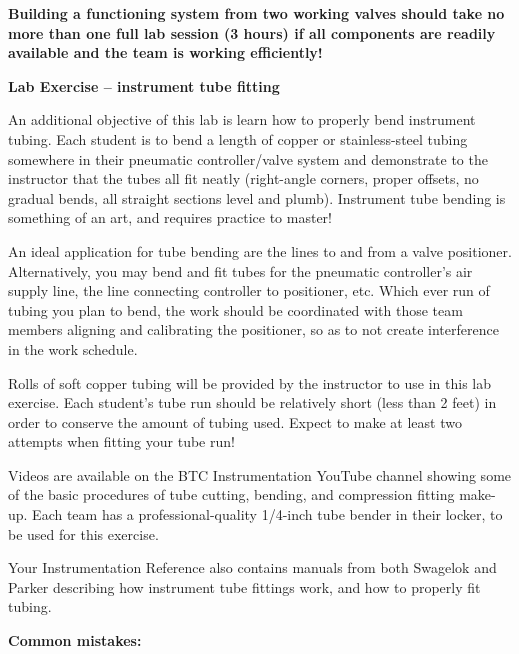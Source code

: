 \vskip 10pt

{\bf Building a functioning system from two working valves should take no more than one full lab session (3 hours) if all components are readily available and the team is working efficiently!}



\vfil \eject

\noindent
{\bf Lab Exercise -- instrument tube fitting}

\vskip 5pt

An additional objective of this lab is learn how to properly bend instrument tubing.  Each student is to bend a length of copper or stainless-steel tubing somewhere in their pneumatic controller/valve system and demonstrate to the instructor that the tubes all fit neatly (right-angle corners, proper offsets, no gradual bends, all straight sections level and plumb).  Instrument tube bending is something of an art, and requires practice to master!

An ideal application for tube bending are the lines to and from a valve positioner.  Alternatively, you may bend and fit tubes for the pneumatic controller's air supply line, the line connecting controller to positioner, etc.  Which ever run of tubing you plan to bend, the work should be coordinated with those team members aligning and calibrating the positioner, so as to not create interference in the work schedule.

Rolls of soft copper tubing will be provided by the instructor to use in this lab exercise.  Each student's tube run should be relatively short (less than 2 feet) in order to conserve the amount of tubing used.  Expect to make at least two attempts when fitting your tube run!

Videos are available on the BTC Instrumentation YouTube channel showing some of the basic procedures of tube cutting, bending, and compression fitting make-up.  Each team has a professional-quality 1/4-inch tube bender in their locker, to be used for this exercise.

Your Instrumentation Reference also contains manuals from both Swagelok and Parker describing how instrument tube fittings work, and how to properly fit tubing.

\vskip 10pt

{\bf Common mistakes:}

